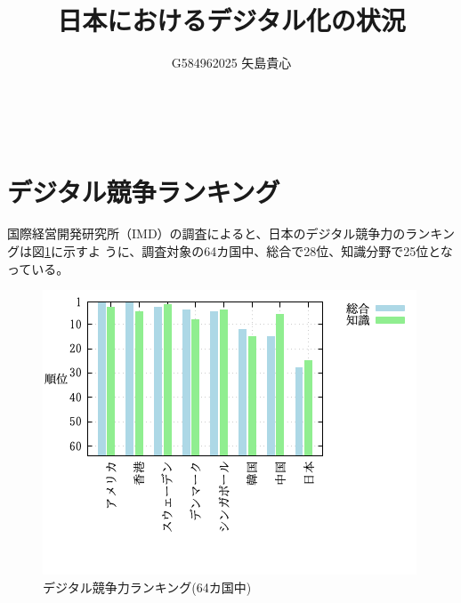 \documentclass[a4paper,11pt,dvipdfmx]{ujarticle}
\title{日本におけるデジタル化の状況}
\author{G584962025   矢島貴心}
\begin{document}
\maketitle %
\

\section{デジタル競争ランキング}
国際経営開発研究所（IMD）の調査\cite{imd}によると、日本のデジタル競争力のランキングは図\ref{graph}に示すよ
うに、調査対象の64カ国中、総合で28位、知識分野で25位となっている。
\begin{figure}[htbp]
    \centering
    \includegraphics{fig31.png}
    \caption{デジタル競争力ランキング(64カ国中)}\label{graph}

\end{figure}

\end{document}
